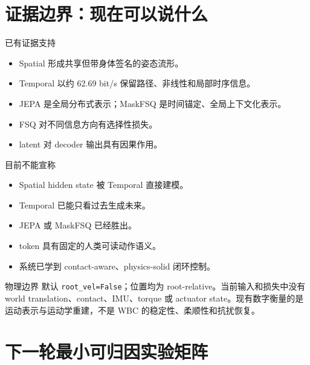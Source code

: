 \documentclass[10pt,a4paper,fontset=none]{ctexart}
\newcommand{\code}[1]{\texttt{\small #1}}
\begin{document}
\section{证据边界：现在可以说什么}

\begin{minipage}[t]{0.49\linewidth}
\begin{insightbox}{\textcolor{ArenaGreen}{已有证据支持}}
\begin{itemize}
  \item Spatial 形成共享但带身体签名的姿态流形。
  \item Temporal 以约 62.69 bit/s 保留路径、非线性和局部时序信息。
  \item JEPA 是全局分布式表示；MaskFSQ 是时间锚定、全局上下文化表示。
  \item FSQ 对不同信息方向有选择性损失。
  \item latent 对 decoder 输出具有因果作用。
\end{itemize}
\end{insightbox}
\end{minipage}\hfill
\begin{minipage}[t]{0.49\linewidth}
\begin{insightbox}{\textcolor{ArenaRed}{目前不能宣称}}
\begin{itemize}
  \item Spatial hidden state 被 Temporal 直接建模。
  \item Temporal 已能只看过去生成未来。
  \item JEPA 或 MaskFSQ 已经胜出。
  \item token 具有固定的人类可读动作语义。
  \item 系统已学到 contact-aware、physics-solid 闭环控制。
\end{itemize}
\end{insightbox}
\end{minipage}

\begin{darkbox}{物理边界}
默认 \code{root\_vel=False}；位置均为 root-relative。当前输入和损失中没有 world translation、contact、IMU、torque 或 actuator state。现有数字衡量的是运动表示与运动学重建，不是 WBC 的稳定性、柔顺性和抗扰恢复。
\end{darkbox}

\section{下一轮最小可归因实验矩阵}
\end{document}
